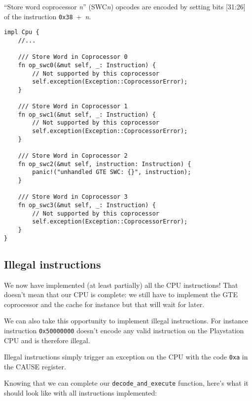 \documentclass[a4paper]{article}
\newcommand{\code}[1] {\texttt{#1}}
\begin{document}
``Store word coprocessor \emph{n}'' (SWC\emph{n}) opcodes are encoded
by setting bits [31:26] of the instruction \code{0x38}~+~\emph{n}.

\begin{lstlisting}
impl Cpu {
    //...

    /// Store Word in Coprocessor 0
    fn op_swc0(&mut self, _: Instruction) {
        // Not supported by this coprocessor
        self.exception(Exception::CoprocessorError);
    }

    /// Store Word in Coprocessor 1
    fn op_swc1(&mut self, _: Instruction) {
        // Not supported by this coprocessor
        self.exception(Exception::CoprocessorError);
    }

    /// Store Word in Coprocessor 2
    fn op_swc2(&mut self, instruction: Instruction) {
        panic!("unhandled GTE SWC: {}", instruction);
    }

    /// Store Word in Coprocessor 3
    fn op_swc3(&mut self, _: Instruction) {
        // Not supported by this coprocessor
        self.exception(Exception::CoprocessorError);
    }
}
\end{lstlisting}

\subsection{Illegal instructions}

We now have implemented (at least partially) all the CPU instructions!
That doesn't mean that our CPU is complete: we still have to implement
the GTE coprocessor and the cache for instance but that will wait for
later.

We can also take this opportunity to implement illegal
instructions. For instance instruction \code{0x50000000} doesn't
encode any valid instruction on the Playstation CPU and is therefore
illegal.

Illegal instructions simply trigger an exception on the CPU with the
code \code{0xa} in the CAUSE register.

Knowing that we can complete our \code{decode\_and\_execute} function,
here's what it should look like with all instructions implemented:
\end{document}
